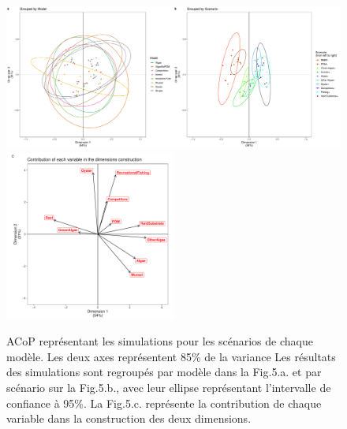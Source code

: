 \documentclass[12pt]{report}
\begin{document}
\begin{figure}[t]
    \centering
    \includegraphics[width = \linewidth]{pointsPCoA_report.pdf}
    \includegraphics[width = 0.5\textwidth,height =  .3\textheight]{axisPcoA_report.pdf}
    \caption[ACoP représentant l'influence de la topologie du modèle dans la réponse du système aux différents scénarios]{ACoP représentant les simulations pour les scénarios de chaque modèle. Les deux axes représentent 85\% de la variance Les résultats des simulations sont regroupés par modèle dans la Fig.5.a. et par scénario sur la Fig.5.b., avec leur ellipse représentant l’intervalle de confiance à 95\%. La Fig.5.c. représente la contribution de chaque variable dans la construction des deux dimensions.}
    \label{fig:5}
\end{figure}

\end{document}
